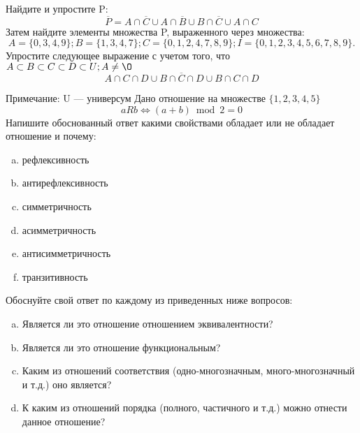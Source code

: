 \documentclass[10pt]{exam}
\begin{document}
\begin{questions}
\question
Найдите и упростите P:
\begin{equation*}
\overline{P} = A \cap \overline{C} \cup A \cap \overline{B} \cup B \cap \overline{C} \cup A \cap C
\end{equation*}
Затем найдите элементы множества P, выраженного через множества:
\begin{equation*}
A = \{0, 3, 4, 9\}; 
B = \{1, 3, 4, 7\};
C = \{0, 1, 2, 4, 7, 8, 9\};
I = \{0, 1, 2, 3, 4, 5, 6, 7, 8, 9\}.
\end{equation*}\question
Упростите следующее выражение с учетом того, что $A\subset B \subset C \subset D \subset U; A \neq \O$
\begin{equation*}
A \cap C  \cap D \cup B \cap \overline{C} \cap D \cup B \cap C \cap D
\end{equation*}

Примечание: U — универсум\question
Дано отношение на множестве $\{1, 2, 3, 4, 5\}$ 
\begin{equation*}
aRb \iff (a+b) \bmod 2 =0
\end{equation*}
Напишите обоснованный ответ какими свойствами обладает или не обладает отношение и почему:   
\begin{enumerate} [a)]\setcounter{enumi}{0}
\item рефлексивность
\item антирефлексивность
\item симметричность
\item асимметричность
\item антисимметричность
\item транзитивность
\end{enumerate}

Обоснуйте свой ответ по каждому из приведенных ниже вопросов:
\begin{enumerate} [a)]\setcounter{enumi}{0}
    \item Является ли это отношение отношением эквивалентности?
    \item Является ли это отношение функциональным?
    \item Каким из отношений соответствия (одно-многозначным, много-многозначный и т.д.) оно является?
    \item К каким из отношений порядка (полного, частичного и т.д.) можно отнести данное отношение?
\end{enumerate}




\end{questions}
\end{document}
